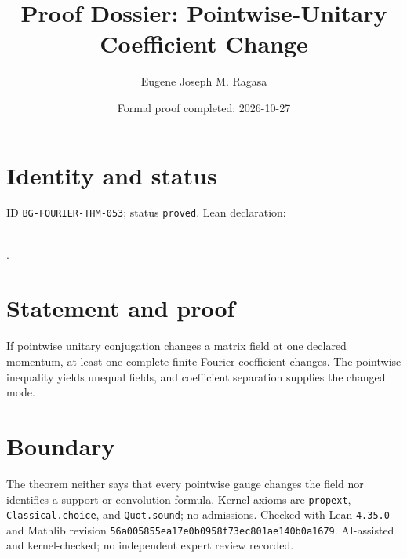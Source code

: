 \documentclass[11pt]{article}
\title{Proof Dossier: Pointwise-Unitary Coefficient Change}\author{Eugene Joseph M. Ragasa}\date{Formal proof completed: 2026-10-27}
\begin{document}
\maketitle
\section{Identity and status}
ID \texttt{BG-FOURIER-THM-053}; status \texttt{proved}. Lean declaration:
\par{}\\
{\tiny{}}.
\section{Statement and proof}
If pointwise unitary conjugation changes a matrix field at one declared momentum, at least
one complete finite Fourier coefficient changes. The pointwise inequality yields unequal
fields, and coefficient separation supplies the changed mode.
\section{Boundary}
The theorem neither says that every pointwise gauge changes the field nor identifies a
support or convolution formula. Kernel axioms are \texttt{propext},
\texttt{Classical.choice}, and \texttt{Quot.sound}; no admissions. Checked with Lean
\texttt{4.35.0} and Mathlib revision
\texttt{56a005855ea17e0b0958f73ec801ae140b0a1679}. AI-assisted and kernel-checked;
no independent expert review recorded.
\end{document}
